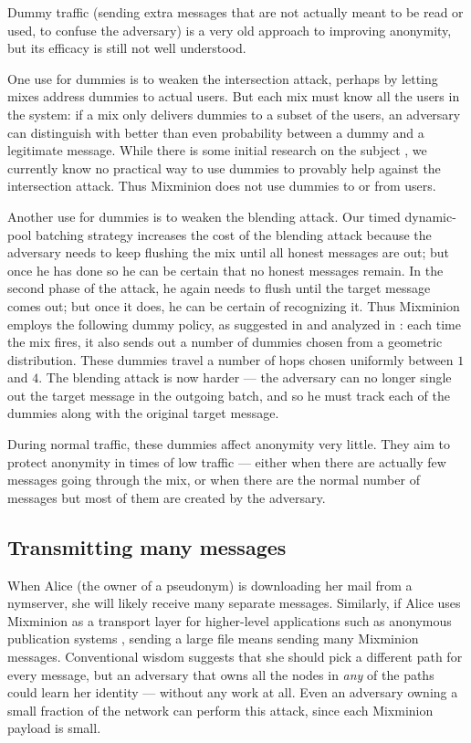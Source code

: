 \documentclass[11pt]{IEEEtran}
\begin{document}
Dummy traffic (sending extra messages that are not actually meant to
be read or used, to confuse the adversary) is a very old approach to
improving anonymity, but its efficacy is still not well understood.

One use for dummies is to weaken the intersection attack, perhaps
by letting mixes address dummies to actual users. But each mix must
know all the users in the system: if a mix only delivers dummies to a
subset of the users, an adversary can distinguish with better than even
probability between a dummy and a legitimate message. While there is
some initial research on the subject \cite{langos02}, we currently know no
practical way to use dummies to provably help against the intersection
attack. Thus Mixminion does not use dummies to or from users.

Another use for dummies is to weaken the blending attack. Our timed
dynamic-pool batching strategy increases the cost of the blending attack
because the adversary needs to keep flushing the mix until all honest
messages are out; but once he has done so he can be certain that no
honest messages remain. In the second phase of the attack, he again
needs to flush until the target message comes out; but once it does, he
can be certain of recognizing it. Thus Mixminion employs the following
dummy policy, as suggested in \cite{batching-taxonomy} and analyzed in 
\cite{andrei-claudia}: each time the mix
fires, it also sends out a number of dummies chosen from a geometric
distribution. These dummies travel a number of hops chosen uniformly
between $1$ and $4$. The blending attack is now harder --- the adversary
can no longer single out the target message in the outgoing batch, and so
he must track each of the dummies along with the original target message.

During normal traffic, these dummies affect anonymity very little. They
aim to protect anonymity in times of low traffic --- either when
there are actually few messages going through the mix,
or when there are the normal number of messages but most of them are
created by the adversary.

\subsection{Transmitting many messages}

When Alice (the owner of a pseudonym) is downloading her mail from a
nymserver, she will likely receive many separate messages. Similarly, if
Alice uses Mixminion as a transport layer for higher-level applications
such as anonymous publication systems \cite{freehaven-berk}, sending a
large file means sending many Mixminion messages.
Conventional wisdom suggests that she should pick a different
path for every message, but an adversary that owns all the nodes in
\emph{any} of the paths could learn her identity --- without any work
at all. Even an adversary owning a small fraction of the network
can perform this attack, since each Mixminion payload is small.
\end{document}
